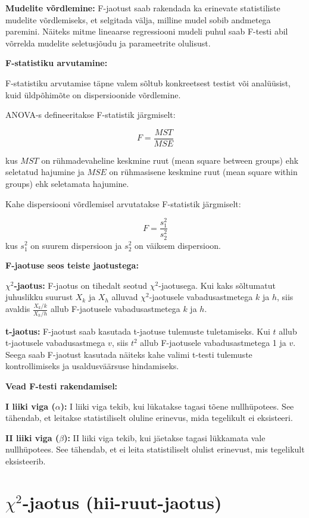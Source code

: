\documentclass[
]{book}
\theoremstyle{definition}
\theoremstyle{definition}
\theoremstyle{definition}
\theoremstyle{definition}
\theoremstyle{remark}
\begin{document}
\textbf{Mudelite võrdlemine:} F-jaotust saab rakendada ka erinevate statistiliste mudelite võrdlemiseks, et selgitada välja, milline mudel sobib andmetega paremini. Näiteks mitme lineaarse regressiooni mudeli puhul saab F-testi abil võrrelda mudelite seletusjõudu ja parameetrite olulisust.

\textbf{F-statistiku arvutamine:}

F-statistiku arvutamise täpne valem sõltub konkreetsest testist või analüüsist, kuid üldpõhimõte on dispersioonide võrdlemine.

ANOVA-s defineeritakse F-statistik järgmiselt:

\[F = \frac{MST}{MSE}\]

kus \(MST\) on rühmadevaheline keskmine ruut (mean square between groups) ehk seletatud hajumine ja \(MSE\) on rühmasisene keskmine ruut (mean square within groups) ehk seletamata hajumine.

Kahe dispersiooni võrdlemisel arvutatakse F-statistik järgmiselt:

\[F = \frac{s_1^2}{s_2^2}\]
kus \(s_1^2\) on suurem dispersioon ja \(s_2^2\) on väiksem dispersioon.

\textbf{F-jaotuse seos teiste jaotustega:}

\textbf{\(\chi^2\)-jaotus:} F-jaotus on tihedalt seotud \(\chi^2\)-jaotusega. Kui kaks sõltumatut juhuslikku suurust \(X_k\) ja \(X_h\) alluvad \(\chi^2\)-jaotusele vabadusastmetega \(k\) ja \(h\), siis avaldis \(\frac{X_k/k}{X_h/h}\) allub F-jaotusele vabadusastmetega \(k\) ja \(h\).

\textbf{t-jaotus:} F-jaotust saab kasutada t-jaotuse tulemuste tuletamiseks. Kui \(t\) allub t-jaotusele vabadusastmega \(v\), siis \(t^2\) allub F-jaotusele vabadusastmetega 1 ja \(v\). Seega saab F-jaotust kasutada näiteks kahe valimi t-testi tulemuste kontrollimiseks ja usaldusväärsuse hindamiseks.

\textbf{Vead F-testi rakendamisel:}

\textbf{I liiki viga (\(\alpha\)):} I liiki viga tekib, kui lükatakse tagasi tõene nullhüpotees. See tähendab, et leitakse statistiliselt oluline erinevus, mida tegelikult ei eksisteeri.

\textbf{II liiki viga (\(\beta\)):} II liiki viga tekib, kui jäetakse tagasi lükkamata vale nullhüpotees. See tähendab, et ei leita statistiliselt olulist erinevust, mis tegelikult eksisteerib.

\section{\texorpdfstring{\(\chi^2\)-jaotus (hii-ruut-jaotus)}{\textbackslash chi\^{}2-jaotus (hii-ruut-jaotus)}}\label{chi2-jaotus-hii-ruut-jaotus}
\end{document}
